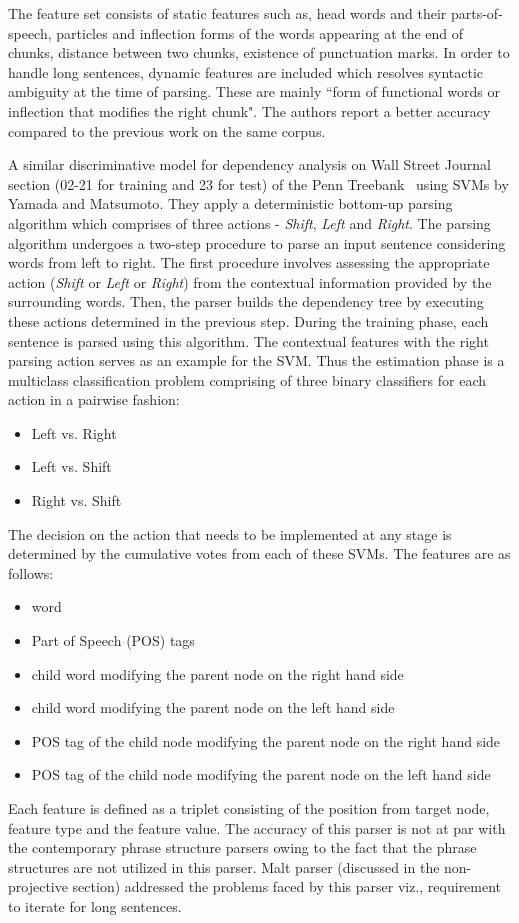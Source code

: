 The feature set consists of static features such as, head words and their parts-of-speech, particles and inflection forms of the words appearing at the end of chunks, distance between two chunks, existence of punctuation marks. In order to handle long sentences, dynamic features are included which resolves syntactic ambiguity at the time of parsing. These are mainly ``form of functional words or inflection that modifies the right chunk". The authors report a better accuracy compared to the previous work on the same corpus.

A similar discriminative model for dependency analysis on Wall Street Journal section (02-21 for training and 23 for test) of the Penn Treebank~\cite{Marcus:1994:PTA:1075812.1075835} using SVMs by Yamada and Matsumoto\cite{yamada2003statistical}.  They apply a deterministic bottom-up parsing algorithm which comprises of three actions - \textit{Shift}, \textit{Left} and \textit{Right}. The parsing algorithm undergoes a two-step procedure to parse an input sentence considering words from left to right. The first procedure involves assessing the appropriate action (\textit{Shift} or  \textit{Left} or \textit{Right}) from the contextual information provided by the surrounding words. Then, the parser builds the dependency tree by executing these actions determined in the previous step. During the training phase, each sentence is parsed using this algorithm. The contextual features with the right parsing action serves as an example for the SVM. Thus the estimation phase is a multiclass classification problem comprising of three binary classifiers for each action in a pairwise fashion:
\begin{itemize}[nolistsep,leftmargin=*]
\item Left vs. Right
\item Left vs. Shift
\item Right vs. Shift
\end{itemize}
The decision on the action that needs to be implemented at any stage is determined by the cumulative votes from each of these SVMs. 
The features are as follows:
\begin{itemize}[nolistsep,leftmargin=*]
\item word
\item Part of Speech (POS) tags
\item child word modifying the parent node on the right hand side
\item child word modifying the parent node on the left hand side
\item POS tag of the child node modifying the parent node on the right hand side
\item POS tag of the child node modifying the parent node on the left hand side
\end{itemize}
Each feature is defined as a triplet consisting of the position from target node, feature type and the feature value. The accuracy of this parser is not at par with the contemporary phrase structure parsers owing to the fact that the phrase structures are not utilized in this parser. Malt parser (discussed in the non-projective section) addressed the problems faced by this parser viz., requirement to iterate for long sentences.

